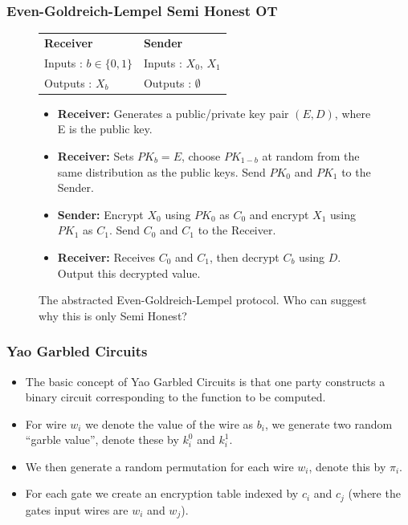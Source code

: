 \documentclass{beamer}
\begin{document}
	\begin{frame}
		\frametitle{Even-Goldreich-Lempel Semi Honest OT}
		\begin{figure}[!htb]
			\begin{tabular}[!htb]{p{6cm} p{6cm}}
				\textbf{Receiver} & \textbf{Sender}\\
				Inputs : $b \in \{0, 1\}$ & Inputs : $X_0$, $X_1$\\
				Outputs : $X_b$ & Outputs : $\emptyset$\\
			\end{tabular}

			\begin{itemize}
				\setlength{\itemsep}{0.5pt}
				\setlength{\parskip}{0pt}
				\setlength{\parsep}{0pt}

 				\item \textbf{Receiver:} Generates a public/private key pair $(E, D)$, where E is the public key.\\
				\item \textbf{Receiver:} Sets $PK_b = E$, choose $PK_{1-b}$ at random from the same distribution as the public keys. Send $PK_0$ and $PK_1$ to the Sender.\\
				\item \textbf{Sender:} Encrypt $X_0$ using $PK_0$ as $C_0$ and encrypt $X_1$ using $PK_1$ as $C_1$. Send $C_0$ and $C_1$ to the Receiver.\\
				\item \textbf{Receiver:} Receives $C_0$ and $C_1$, then decrypt $C_b$ using $D$. Output this decrypted value.
			\end{itemize}

			\caption{The abstracted Even-Goldreich-Lempel protocol. Who can suggest why this is only Semi Honest? \label{fig:EvenGoldreichLempel}}
		\end{figure}
	\end{frame}

	\begin{frame}
		\frametitle{Yao Garbled Circuits}
		\begin{itemize}
			\item The basic concept of Yao Garbled Circuits is that one party constructs a binary circuit corresponding to the function to be computed.
			\item For wire $w_i$ we denote the value of the wire as $b_i$, we generate two random ``garble value'', denote these by $k_i^0$ and $k_i^1$.
			\item We then generate a random permutation for each wire $w_i$, denote this by $\pi_i$.
			\item For each gate we create an encryption table indexed by $c_i$ and $c_j$ (where the gates input wires are $w_i$ and $w_j$).
		\end{itemize}

	\end{frame}
\end{document}
